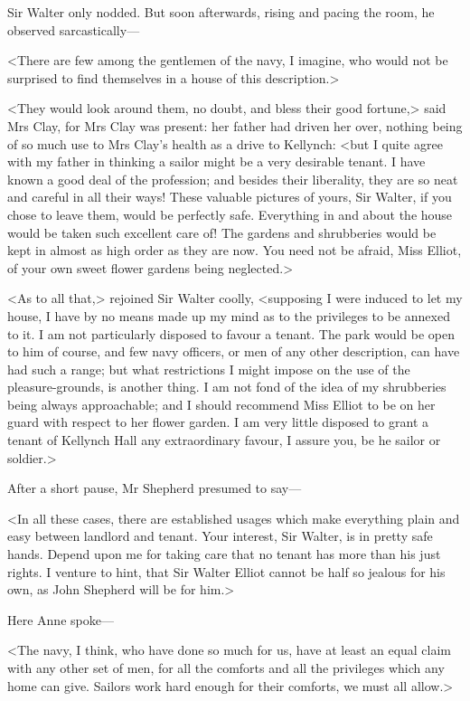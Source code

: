 Sir Walter only nodded. But soon afterwards, rising and pacing the room, he observed sarcastically—

<There are few among the gentlemen of the navy, I imagine, who would not be surprised to find themselves in a house of this description.>

<They would look around them, no doubt, and bless their good fortune,> said Mrs Clay, for Mrs Clay was present: her father had driven her over, nothing being of so much use to Mrs Clay's health as a drive to Kellynch: <but I quite agree with my father in thinking a sailor might be a very desirable tenant. I have known a good deal of the profession; and besides their liberality, they are so neat and careful in all their ways! These valuable pictures of yours, Sir Walter, if you chose to leave them, would be perfectly safe. Everything in and about the house would be taken such excellent care of! The gardens and shrubberies would be kept in almost as high order as they are now. You need not be afraid, Miss Elliot, of your own sweet flower gardens being neglected.>

<As to all that,> rejoined Sir Walter coolly, <supposing I were induced to let my house, I have by no means made up my mind as to the privileges to be annexed to it. I am not particularly disposed to favour a tenant. The park would be open to him of course, and few navy officers, or men of any other description, can have had such a range; but what restrictions I might impose on the use of the pleasure-grounds, is another thing. I am not fond of the idea of my shrubberies being always approachable; and I should recommend Miss Elliot to be on her guard with respect to her flower garden. I am very little disposed to grant a tenant of Kellynch Hall any extraordinary favour, I assure you, be he sailor or soldier.>

After a short pause, Mr Shepherd presumed to say—

<In all these cases, there are established usages which make everything plain and easy between landlord and tenant. Your interest, Sir Walter, is in pretty safe hands. Depend upon me for taking care that no tenant has more than his just rights. I venture to hint, that Sir Walter Elliot cannot be half so jealous for his own, as John Shepherd will be for him.>

Here Anne spoke—

<The navy, I think, who have done so much for us, have at least an equal claim with any other set of men, for all the comforts and all the privileges which any home can give. Sailors work hard enough for their comforts, we must all allow.>

